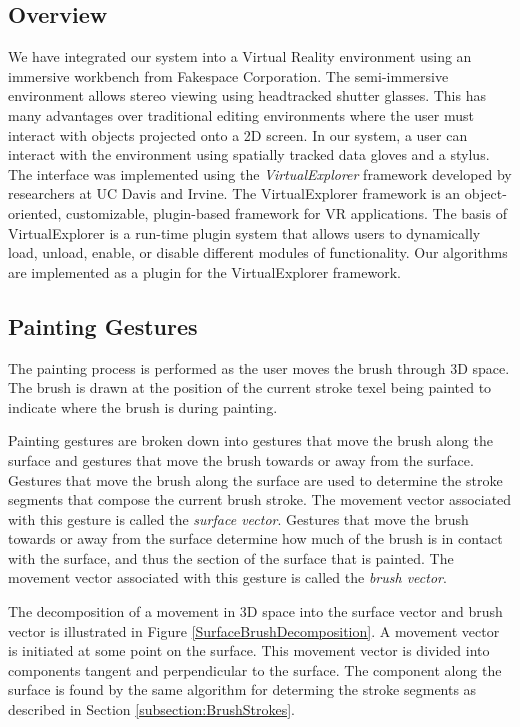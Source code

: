 \documentclass[10pt,twocolumn]{article}
\begin{document}
\subsection{Overview}
\indent We have integrated our system into a Virtual Reality 
environment using an immersive workbench from Fakespace Corporation. 
The semi-immersive environment allows stereo viewing using headtracked shutter glasses.
This has many advantages over traditional editing environments where the user must interact
with objects projected onto a 2D screen.
In our system, a user can interact with the environment 
using spatially tracked data gloves and a stylus. 
The interface was implemented using the {\em VirtualExplorer} 
framework developed by researchers at UC Davis and Irvine. 
The VirtualExplorer framework is an object-oriented, customizable, plugin-based
framework for VR applications. 
The basis of VirtualExplorer is a run-time plugin system
that allows users to dynamically load, unload, enable, or disable 
different modules of functionality.
Our algorithms are implemented as a plugin for the VirtualExplorer framework.

\subsection{Painting Gestures}
The painting process is performed as the user moves the brush through 3D space.
The brush is drawn at the position of the current stroke texel
being painted to indicate where the brush is during painting.

Painting gestures are broken down into gestures that move the brush along the surface
and gestures that move the brush towards or away from the surface. 
Gestures that move the brush along the surface are used to determine the stroke 
segments that compose the current brush stroke. The movement vector
associated with this gesture is called the {\em surface vector}. 
Gestures that move the brush towards or away from
the surface determine how much of the brush is in contact with the surface, 
and thus the section of the surface that is painted. The movement vector
associated with this gesture is called the {\em brush vector}. 

The decomposition of a movement in 3D space into the surface vector and brush vector
is illustrated in Figure \ref{SurfaceBrushDecomposition}. 
A movement vector is initiated at some point on the surface. This movement vector
is divided into components tangent and perpendicular to the surface.
The component along the surface is found by the same algorithm for 
determing the stroke segments as described in Section \ref{subsection:BrushStrokes}.
\end{document}

